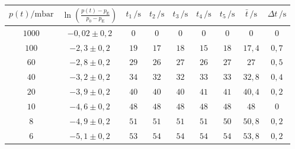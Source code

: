 \begin{table}
	\begin{center}
		\begin{tabular}{cc|ccccc|cc}
			\toprule
			{$p(t) /\mathrm{mbar}$} & {$\ln \left(\frac{p(t) - p_\text{E}}{p_0 - p_\text{E}}\right)$} & {$t_1\, /\mathrm{s}$} & {$t_2\, /\mathrm{s}$} & {$t_3\, /\mathrm{s}$} & {$t_4\, /\mathrm{s}$} & {$t_5\, /\mathrm{s}$} & {$\bar{t}\, /\mathrm{s}$} & {$\Delta t\, /\mathrm{s}$} \\ \midrule
			$1000$          &                  $-0,02 \pm 0,2$                   &          $0$          &          $0$          &          $0$          &          $0$          &          $0$          &            $0$            &            $0$             \\
			$100$          &                   $-2,3\pm 0,2$                    &         $19$          &         $17$          &         $18$          &         $15$          &         $18$          &          $17,4$           &           $0,7$            \\
			$60$           &                   $-2,8\pm 0,2$                    &         $29$          &         $26$          &         $27$          &         $26$          &         $27$          &           $27$            &           $0,5$            \\
			$40$           &                   $-3,2\pm 0,2$                    &         $34$          &         $32$          &         $32$          &         $33$          &         $33$          &          $32,8$           &           $0,4$            \\
			$20$           &                   $-3,9\pm 0,2$                    &         $40$          &         $40$          &         $40$          &         $41$          &         $41$          &          $40,4$           &           $0,2$            \\
			$10$           &                   $-4,6\pm 0,2$                    &         $48$          &         $48$          &         $48$          &         $48$          &         $48$          &           $48$            &            $0$             \\
			$8$           &                   $-4,9\pm 0,2$                    &         $51$          &         $51$          &         $51$          &         $51$          &         $50$          &          $50,8$           &           $0,2$            \\
			$6$           &                   $-5,1\pm 0,2$                    &         $53$          &         $54$          &         $54$          &         $54$          &         $54$          &          $53,8$           &           $0,2$            \\

\end{tabular}
\end{center}
\end{table}
